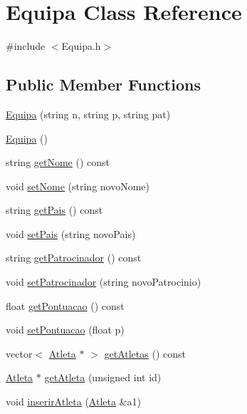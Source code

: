 \hypertarget{class_equipa}{}\section{Equipa Class Reference}
\label{class_equipa}


{\ttfamily \#include $<$Equipa.\+h$>$}

\subsection*{Public Member Functions}
\begin{DoxyCompactItemize}
\item 
\hyperlink{class_equipa_a2721072fa0d6b4451d22fdfe3c3f3c0e}{Equipa} (string n, string p, string pat)
\item 
\hyperlink{class_equipa_a71e864835165c2be093784ef38fd634d}{Equipa} ()
\item 
string \hyperlink{class_equipa_a9d20d0c8daa94e7562c5ea173337a224}{get\+Nome} () const 
\item 
void \hyperlink{class_equipa_a13e90216eb9ca9d6b2c144295a2b6730}{set\+Nome} (string novo\+Nome)
\item 
string \hyperlink{class_equipa_ac0d2108875ef6ed5833bfbd2f9921625}{get\+Pais} () const 
\item 
void \hyperlink{class_equipa_a2360f13c75fdcf75395cef84a9d0f589}{set\+Pais} (string novo\+Pais)
\item 
string \hyperlink{class_equipa_a241ab40d7dfe77af53b834482c79b94f}{get\+Patrocinador} () const 
\item 
void \hyperlink{class_equipa_aca1891ba657401bff00291ab22bb430a}{set\+Patrocinador} (string novo\+Patrocinio)
\item 
float \hyperlink{class_equipa_aeccebdc0af7faf1553e7c7eefe9e66af}{get\+Pontuacao} () const 
\item 
void \hyperlink{class_equipa_a9b63be5bd83117f9bd71bfa6e140da0d}{set\+Pontuacao} (float p)
\item 
vector$<$ \hyperlink{class_atleta}{Atleta} $\ast$ $>$ \hyperlink{class_equipa_a24c4de83cc1171ce42f442ef7be8a7c4}{get\+Atletas} () const 
\item 
\hyperlink{class_atleta}{Atleta} $\ast$ \hyperlink{class_equipa_a9b3eaddbfd2944cffb37f242cba00fa1}{get\+Atleta} (unsigned int id)
\item 
void \hyperlink{class_equipa_a67f982e822a7772f2668301db0e147eb}{inserir\+Atleta} (\hyperlink{class_atleta}{Atleta} \&a1)
\item 

\end{DoxyCompactItemize}
